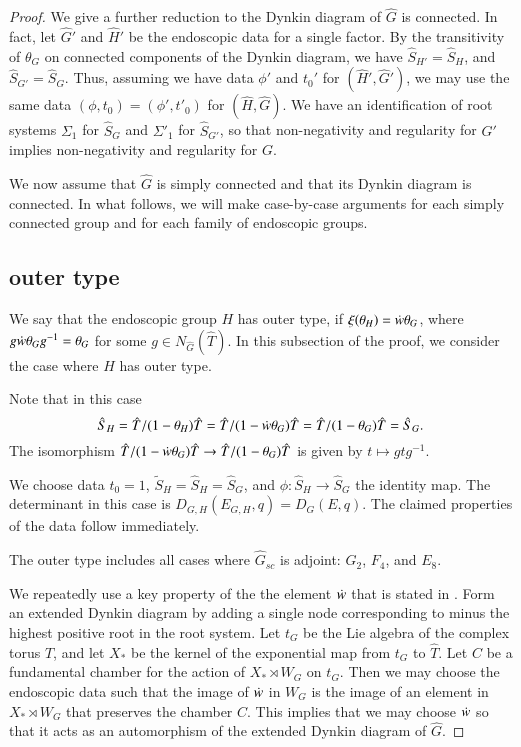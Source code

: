 \begin{proof}
We give a further reduction to the Dynkin diagram of $\hat G$ is connected.
In fact, let $\hat G'$ and $\hat H'$ be the endoscopic data for a single factor.  By the transitivity of $\theta_G$ on connected
components of the Dynkin diagram, we have $\hat S_{H'} = \hat S_H$, and $\hat S_{G'} = \hat S_{G}$.  Thus, assuming we have
data $\phi'$ and $t_0'$ for $(\hat H',\hat G')$, we may use the same data $(\phi,t_0)=(\phi',t'_0)$ for $(\hat H,\hat G)$.
We have an identification of root systems $\Sigma_1$ for $\hat S_G$ and $\Sigma'_1$ for $\hat S_{G'}$, so that non-negativity and regularity
for $G'$ implies non-negativity and regularity for $G$.

We now assume that $\hat G$ is simply connected and that its Dynkin diagram is connected.
In what follows, we will make case-by-case arguments for each simply connected group and for each
family of endoscopic groups.

\subsection{outer type}

We say that the endoscopic group $H$ has outer type, if $\xi(\theta_H) = \dot w  \theta_G$, where $g\dot w \theta_Gg^{-1}=\theta_G$ for some 
$g\in N_{\hat G}(\hat T)$.
In this subsection of the proof, we consider the case where $H$ has outer type.

Note that in this case
\[
\hat S_H = \hat T/(1-\theta_H) \hat T = \hat T/(1-\dot w \theta_G)\hat T = \hat T/(1-\theta_G)\hat T = \hat S_G.
\]
The isomorphism $\hat T/(1-\dot w \theta_G)\hat T\to \hat T/(1-\theta_G)\hat T$ is given by $t \mapsto g t g^{-1}$.

We choose data $t_0=1$, $\tilde S_H = \hat S_H = \hat S_G$, and $\phi:\hat S_H\to \hat S_G$ the identity map.
The determinant in this case is $D_{G,H}(E_{G,H},q) = D_G(E,q)$.  The claimed properties of the data follow immediately.

The outer type includes all cases where $\hat G_{sc}$ is adjoint: $G_2$, $F_4$, and $E_8$.


We  repeatedly use a key property of the the element $\dot w $ that is stated in \cite[\S4.7]{hales1993simple}.
Form an extended Dynkin diagram by adding a single node corresponding to minus the highest positive root in the root system.
Let $t_G$ be the Lie algebra of the complex torus $\hat T$, and let $X_*$ be the kernel of the exponential map from $t_G$ to $\hat T$.
Let $C$ be a fundamental chamber for the action of $X_*\rtimes W_G$ on $t_G$.   Then we may choose the endoscopic data such
that the image of $\dot w $ in $W_G$ is the image of an element in $X_*\rtimes W_G$ that
preserves the chamber $C$.  This implies that we may choose $\dot w $ so that it acts as an automorphism of the extended Dynkin diagram
of $\hat G$.



\end{proof}
